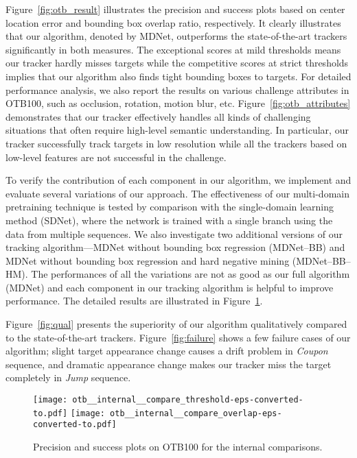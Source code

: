 \documentclass[10pt,twocolumn,letterpaper]{article}
\begin{document}
Figure~\ref{fig:otb_result} illustrates the precision and success plots based on center location error and bounding box overlap ratio, respectively.
It clearly illustrates that our algorithm, denoted by MDNet, outperforms the state-of-the-art trackers significantly in both measures.
The exceptional scores at mild thresholds means our tracker hardly misses targets while the competitive scores at strict thresholds implies that our algorithm also finds tight bounding boxes to targets.
For detailed performance analysis, we also report the results on various challenge attributes in OTB100,  such as occlusion, rotation, motion blur, etc.
Figure~\ref{fig:otb_attributes} demonstrates that our tracker effectively handles all kinds of challenging situations that often require high-level semantic understanding.
In particular, our tracker successfully track targets in low resolution while all the trackers based on low-level features are not successful in the challenge.

To verify the contribution of each component in our algorithm, we implement and evaluate several variations of our approach.
The effectiveness of our multi-domain pretraining technique is tested by comparison with the single-domain learning method (SDNet), where the network is trained with a single branch using the data from multiple sequences.
We also investigate two additional versions of our tracking algorithm---MDNet without bounding box regression (MDNet--BB) and MDNet without bounding box regression and hard negative mining (MDNet--BB--HM). 
The performances of all the variations are not as good as our full algorithm (MDNet) and each component in our tracking algorithm is helpful to improve performance.
The detailed results are illustrated in Figure~\ref{fig:component}.

Figure~\ref{fig:qual} presents the superiority of our algorithm qualitatively compared to the state-of-the-art trackers.
Figure~\ref{fig:failure} shows a few failure cases of our algorithm; slight target appearance change causes a drift problem in \emph{Coupon} sequence, and dramatic appearance change makes our tracker miss the target completely in \emph{Jump} sequence.

\begin{figure}[t]
\begin{center}
\texttt{[image: otb\_\_internal\_\_compare\_threshold-eps-converted-to.pdf]}
\texttt{[image: otb\_\_internal\_\_compare\_overlap-eps-converted-to.pdf]}
\end{center}
\vspace{-5mm}
\caption{Precision and success plots on OTB100 for the internal comparisons. }
\label{fig:component}
\vspace{-1mm}
\end{figure}
\end{document}
